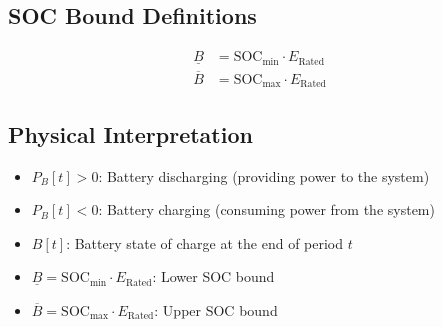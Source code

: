 \documentclass[11pt]{article}
\begin{document}
\subsection{SOC Bound Definitions}
\begin{align}
\underline{B} &= \text{SOC}_{\min} \cdot E_{\text{Rated}} \\
\overline{B} &= \text{SOC}_{\max} \cdot E_{\text{Rated}}
\end{align}

\subsection{Physical Interpretation}
\begin{itemize}
    \item $P_B[t] > 0$: Battery discharging (providing power to the system)
    \item $P_B[t] < 0$: Battery charging (consuming power from the system)
    \item $B[t]$: Battery state of charge at the end of period $t$
    \item $\underline{B} = \text{SOC}_{\min} \cdot E_{\text{Rated}}$: Lower SOC bound
    \item $\overline{B} = \text{SOC}_{\max} \cdot E_{\text{Rated}}$: Upper SOC bound
\end{itemize}
\end{document}
